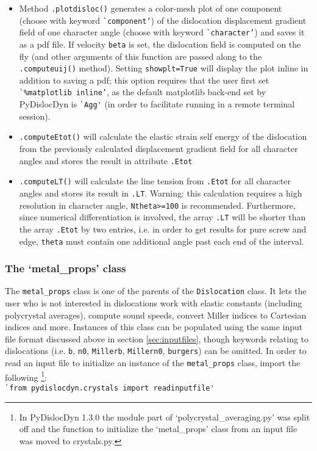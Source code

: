 \documentclass[11pt,letterpaper,oneside,pdftex]{article}
\begin{document}
\begin{itemize}
\item Method \verb|.plotdisloc()| generates a color-mesh plot of one component (choose with keyword \verb|`component’|) of the dislocation displacement gradient field of one character angle (choose with keyword \verb|`character’|) and saves it as a pdf file.
If velocity \verb|beta| is set, the dislocation field is computed on the fly (and other arguments of this function are passed along to the \verb|.computeuij()| method).
Setting \verb|showplt=True| will display the plot inline in addition to saving a pdf;
this option requires that the user first set \verb|`%matplotlib inline’|, as the default matplotlib back-end set by PyDislocDyn is \verb|`Agg'| (in order to facilitate running in a remote terminal session).

\item \verb|.computeEtot()| will calculate the elastic strain self energy of the dislocation from the previously calculated displacement gradient field for all character angles and stores the result in attribute \verb|.Etot|

\item \verb|.computeLT()| will calculate the line tension from \verb|.Etot| for all character angles and stores its result in \verb|.LT|.
Warning: this calculation requires a high resolution in character angle, \verb|Ntheta>=100| is recommended.
Furthermore, since numerical differentiation is involved, the array \verb|.LT| will be shorter than the array \verb|.Etot| by two entries, i.e. in order to get results for pure screw and edge, \verb|theta| must contain one additional angle past each end of the interval.
\end{itemize}


\subsubsection{The `metal\_props' class}
\label{sec:metal_props}

The \verb|metal_props| class is one of the parents of the \verb|Dislocation| class.
It lets the user who is not interested in dislocations work with elastic constants (including polycrystal averages), compute sound speeds, convert Miller indices to Cartesian indices and more.
Instances of this class can be populated using the same input file format discussed above in section \ref{sec:inputfiles}, though keywords relating to dislocations (i.e. \verb|b|, \verb|n0|, \verb|Millerb|, \verb|Millern0|, \verb|burgers|) can be omitted.
In order to read an input file to initialize an instance of the \verb|metal_props| class, import the following
\footnote{In PyDislocDyn 1.3.0 the module part of `polycrystal\_averaging.py' was split off and the function to initialize the `metal\_props' class from an input file was moved to crystals.py.}:
\\\verb|`from pydislocdyn.crystals import readinputfile'|
\end{document}
